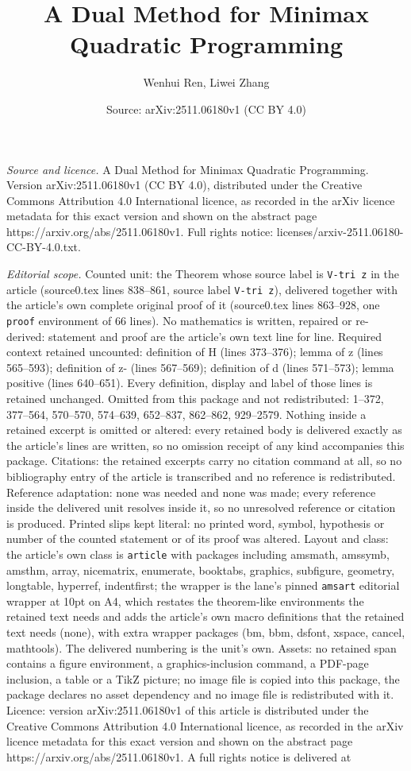 \documentclass[10pt,a4paper]{amsart}
\title[A Dual Method for Minimax Quadratic Programming]{A Dual Method for Minimax Quadratic Programming}
\author{Wenhui Ren, Liwei Zhang}
\date{Source: arXiv:2511.06180v1 (CC BY 4.0)}
\begin{document}
\maketitle

\noindent\emph{Source and licence.} A Dual Method for Minimax Quadratic Programming. Version arXiv:2511.06180v1 (CC BY 4.0), distributed under the Creative Commons Attribution 4.0 International licence, as recorded in the arXiv licence metadata for this exact version and shown on the abstract page https://arxiv.org/abs/2511.06180v1. Full rights notice: licenses/arxiv-2511.06180-CC-BY-4.0.txt.\par\smallskip

\noindent\textit{Editorial scope.} Counted unit: the Theorem whose source label is \texttt{V-tri z} in the article (source0.tex lines 838--861, source label \texttt{V-tri z}), delivered together with the article's own complete original proof of it (source0.tex lines 863--928, one \texttt{proof} environment of 66 lines). No mathematics is written, repaired or re-derived: statement and proof are the article's own text line for line. Required context retained uncounted: definition of H (lines 373--376); lemma of z (lines 565--593); definition of z- (lines 567--569); definition of d (lines 571--573); lemma positive (lines 640--651). Every definition, display and label of those lines is retained unchanged. Omitted from this package and not redistributed: 1--372, 377--564, 570--570, 574--639, 652--837, 862--862, 929--2579. Nothing inside a retained excerpt is omitted or altered: every retained body is delivered exactly as the article's lines are written, so no omission receipt of any kind accompanies this package. Citations: the retained excerpts carry no citation command at all, so no bibliography entry of the article is transcribed and no reference is redistributed. Reference adaptation: none was needed and none was made; every reference inside the delivered unit resolves inside it, so no unresolved reference or citation is produced. Printed slips kept literal: no printed word, symbol, hypothesis or number of the counted statement or of its proof was altered. Layout and class: the article's own class is \texttt{article} with packages including amsmath, amssymb, amsthm, array, nicematrix, enumerate, booktabs, graphics, subfigure, geometry, longtable, hyperref, indentfirst; the wrapper is the lane's pinned \texttt{amsart} editorial wrapper at 10pt on A4, which restates the theorem-like environments the retained text needs and adds the article's own macro definitions that the retained text needs (none), with extra wrapper packages (bm, bbm, dsfont, xspace, cancel, mathtools). The delivered numbering is the unit's own. Assets: no retained span contains a figure environment, a graphics-inclusion command, a PDF-page inclusion, a table or a TikZ picture; no image file is copied into this package, the package declares no asset dependency and no image file is redistributed with it. Licence: version arXiv:2511.06180v1 of this article is distributed under the Creative Commons Attribution 4.0 International licence, as recorded in the arXiv licence metadata for this exact version and shown on the abstract page https://arxiv.org/abs/2511.06180v1. A full rights notice is delivered at 
\end{document}

